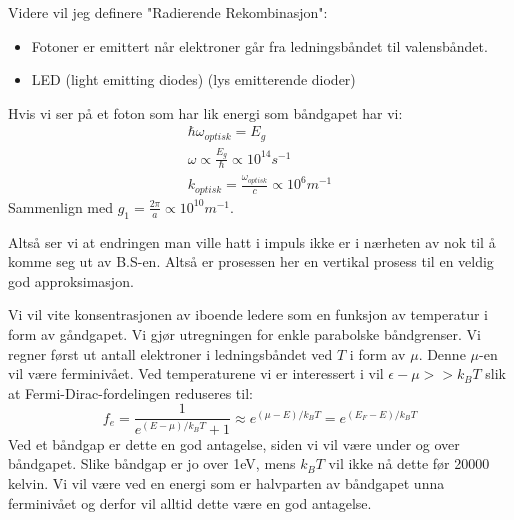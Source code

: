 \documentclass{article}
\begin{document}
Videre vil jeg definere "Radierende Rekombinasjon":
\begin{itemize}
  \item Fotoner er emittert når elektroner går fra ledningsbåndet til valensbåndet.
  \item LED (light emitting diodes) (lys emitterende dioder)
\end{itemize}

Hvis vi ser på et foton som har lik energi som båndgapet har vi:
\begin{align}
  \hbar \omega_{optisk} = E_g \\
  \omega \propto \frac{E_g}{\hbar} \propto 10^{14} s^{-1} \\
  k_{optisk} = \frac{\omega_{optisk}}{c} \propto 10^6 m^{-1}
\end{align}
Sammenlign med $g_1 = \frac{2 \pi}{a} \propto 10^{10} m^{-1}$.

Altså ser vi at endringen man ville hatt i impuls ikke er i nærheten av nok til å komme seg ut av B.S-en. Altså er prosessen her en vertikal prosess til en veldig god approksimasjon. 

Vi vil vite konsentrasjonen av iboende ledere som en funksjon av temperatur i form av gåndgapet. Vi gjør  utregningen for enkle parabolske båndgrenser. Vi regner først ut antall elektroner i ledningsbåndet ved $T$ i form av $\mu$. Denne $\mu$-en vil være ferminivået. Ved temperaturene vi er interessert i vil $\epsilon - \mu >> k_BT$ slik at Fermi-Dirac-fordelingen reduseres til:
\begin{equation}
    f_e  = \frac{1}{e^{(E - \mu ) /k_BT}+1}\approx e^{(\mu - E) /k_BT} = e^{(E_F - E)/k_BT}
\end{equation}
Ved et båndgap er dette en god antagelse, siden vi vil være under og over båndgapet. Slike båndgap er jo over 1eV, mens $k_B T$ vil ikke nå dette før 20000 kelvin. Vi vil være ved en energi som er halvparten av båndgapet unna ferminivået og derfor vil alltid dette være en god antagelse.
\end{document}

